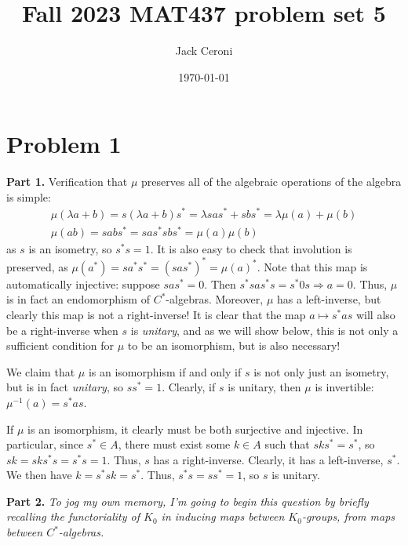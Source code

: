 \documentclass[aps,pra,showpacs,notitlepage,onecolumn,superscriptaddress,nofootinbib]{revtex4-1}
\newcommand{\hhrulefill}{\hspace{-1.0em}\hrulefill}
\theoremstyle{definition}
\begin{document}
\title{Fall 2023 MAT437 problem set 5}
\author{Jack Ceroni}

\date{\today}

\maketitle

\hhrulefill

\section{Problem 1}

\noindent \textbf{Part 1.} Verification that $\mu$ preserves all of the algebraic operations of the algebra is simple:
\begin{align}
  \mu(\lambda a + b) = s (\lambda a + b) s^{*} = \lambda s a s^{*} + s b s^{*} = \lambda \mu(a) + \mu(b) \\
  \mu(ab) = s ab s^{*} = s a s^{*} s b s^{*} = \mu(a) \mu(b)
\end{align}
as $s$ is an isometry, so $s^{*} s = 1$. It is also easy to check that involution is preserved, as $\mu(a^{*}) = s a^{*} s^{*} = (s a s^{*})^{*} = \mu(a)^{*}$. Note that
this map is automatically injective: suppose $s a s^{*} = 0$. Then $s^{*} s a s^{*} s = s^{*} 0 s \Rightarrow a = 0$. Thus, $\mu$ is in fact an endomorphism of $C^{*}$-algebras.
Moreover, $\mu$ has a left-inverse, but clearly this map is not a right-inverse! It is clear that the map $a \mapsto s^{*} a s$ will also be a right-inverse when $s$ is \emph{unitary}, and
as we will show below, this is not only a sufficient condition for $\mu$ to be an isomorphism, but is also necessary!

We claim that $\mu$ is an isomorphism if and only if $s$ is not only just an isometry, but is in fact \emph{unitary},
so $s s^{*} = 1$. Clearly, if $s$ is unitary, then $\mu$ is invertible: $\mu^{-1}(a) = s^{*} a s$.

If $\mu$ is an isomorphism, it clearly must
be both surjective and injective. In particular, since $s^{*} \in A$, there must exist some $k \in A$ such that $s k s^{*} = s^{*}$, so $sk = sk s^{*} s = s^{*} s = 1$. Thus,
$s$ has a right-inverse. Clearly, it has a left-inverse, $s^{*}$. We then have $k = s^{*} s k = s^{*}$. Thus, $s^{*} s = s s^{*} = 1$, so $s$ is unitary.
\newline

\noindent \textbf{Part 2.} \emph{To jog my own memory, I'm going to begin this question by briefly recalling the functoriality of $K_0$ in inducing maps between $K_0$-groups,
from maps between $C^{*}$-algebras.}
\newline
\end{document}
